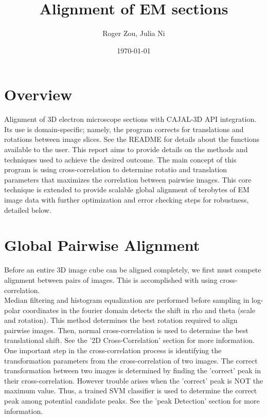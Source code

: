 \documentclass{article}
\author{Roger Zou, Julia Ni}
\date{\today}
\title{Alignment of EM sections}
\begin{document}
  
\maketitle

\section{Overview}
Alignment of 3D electron microscope sections with CAJAL-3D API integration. Its use is domain-specific; namely, the program corrects for translations and rotations between image slices.  See the README for details about the functions available to the user. This report aims to provide details on the methods and techniques used to achieve the desired outcome. The main concept of this program is using cross-correlation to determine rotatio and translation parameters that maximizes the correlation between pairwise images. This core technique is extended to provide scalable global alignment of terobytes of EM image data with further optimization and error checking steps for robustness, detailed below.

\section{Global Pairwise Alignment}
Before an entire 3D image cube can be aligned completely, we first must compete alignment between pairs of images. This is accomplished with using cross-correlation.\\
Median filtering and histogram equalization are performed before sampling in log-polar coordinates in the fourier domain detects the shift in rho and theta (scale and rotation). This method determines the best rotation required to align pairwise images. Then, normal cross-correlation is used to determine the best translational shift. See the '2D Cross-Correlation' section for more information.\\
One important step in the cross-correlation process is identifying the transformation parameters from the cross-correlation of two images. The correct transformation between two images is determined by finding the 'correct' peak in their cross-correlation. However trouble arises when the 'correct' peak is NOT the maximum value. Thus, a trained SVM classifier is used to determine the correct peak among potential candidate peaks. See the 'peak Detection' section for more information. \\
\end{document}
